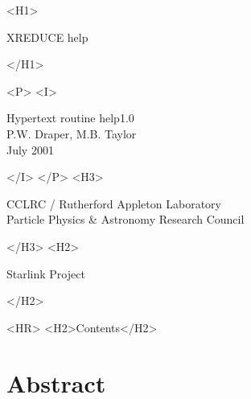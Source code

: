 \documentclass[11pt]{article}
\newcommand{\stardoccategory}  {Hypertext routine help}
\newcommand{\stardocnumber}    {1.0}
\newcommand{\stardocauthors}   {P.W. Draper, M.B. Taylor}
\newcommand{\stardocdate}      {July 2001}
\newcommand{\stardoctitle}     {XREDUCE help}
\newcommand{\htmladdnormallink}[2]{#1}
\newcommand{\htmladdimg}[1]{}
\newcommand{\htmlref}[2]{#1}
\newcommand{\htmladdtonavigation}[1]{}
\newcommand{\xlabel}[1]{}
\newcommand{\latexonlytoc}[0]{\tableofcontents}
\begin{document}
\begin{htmlonly}
   \xlabel{}
   \begin{rawhtml} <H1> \end{rawhtml}
      \stardoctitle
   \begin{rawhtml} </H1> \end{rawhtml}


   \begin{rawhtml} <P> <I> \end{rawhtml}
   \stardoccategory \stardocnumber \\
   \stardocauthors \\
   \stardocdate
   \begin{rawhtml} </I> </P> <H3> \end{rawhtml}
      \htmladdnormallink{CCLRC}{http://www.cclrc.ac.uk} /
      \htmladdnormallink{Rutherford Appleton Laboratory}
                        {http://www.cclrc.ac.uk/ral} \\
      Particle Physics \& Astronomy Research Council \\
   \begin{rawhtml} </H3> <H2> \end{rawhtml}
      \htmladdnormallink{Starlink Project}{http://star-www.rl.ac.uk/}
   \begin{rawhtml} </H2> \end{rawhtml}

  \label{stardoccontents}
  \begin{rawhtml}
    <HR>
    <H2>Contents</H2>
  \end{rawhtml}
  \renewcommand{\latexonlytoc}[0]{}
  \htmladdtonavigation{\htmlref{\htmladdimg{contents_motif.gif}}
        {stardoccontents}}

  \section{\xlabel{abstract}Abstract}

\end{htmlonly}
\end{document}
